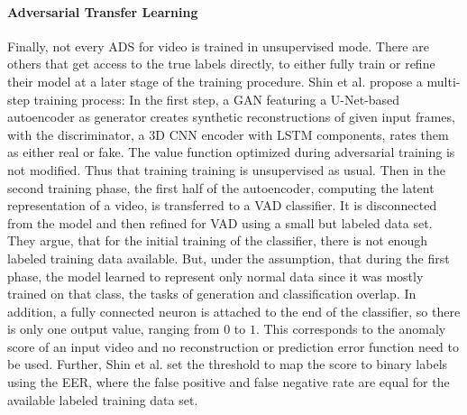\paragraph{Adversarial Transfer Learning}

Finally, not every ADS for video is trained in unsupervised mode. There are others that get access to the true labels directly, to either fully train or refine their model at a later stage of the training procedure. Shin et al. \cite{shin20203d} propose a multi-step training process: In the first step, a GAN featuring a U-Net-based autoencoder as generator creates synthetic reconstructions of given input frames, with the discriminator, a 3D CNN encoder with LSTM components, rates them as either real or fake. The value function optimized during adversarial training is not modified. Thus that training training is unsupervised as usual. Then in the second training phase, the first half of the autoencoder, computing the latent representation of a video, is transferred to a VAD classifier. It is disconnected from the model and then refined for VAD using a small but labeled data set. They argue, that for the initial training of the classifier, there is not enough labeled training data available. But, under the assumption, that during the first phase, the model learned to represent only normal data since it was mostly trained on that class, the tasks of generation and classification overlap. In addition, a fully connected neuron is attached to the end of the classifier, so there is only one output value, ranging from $0$ to $1$. This corresponds to the anomaly score of an input video and no reconstruction or prediction error function need to be used. Further, Shin et al. set the threshold to map the score to binary labels using the EER, where the false positive and false negative rate are equal for the available labeled training data set.

